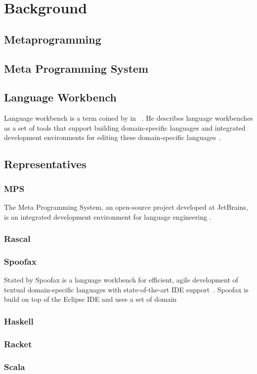 \chapter{Background}

\section{Metaprogramming}

\section{Meta Programming System}

\section{Language Workbench}

Language workbench is a term coined by \citeauthor{fowler2005language} in \citeyear{fowler2005language}~\cite{fowler2005language}.
He describes language workbenches as a set of tools that support building domain-specific languages and integrated development environments for editing these domain-specific languages~\cite{fowler2010domain}.

\section{Representatives}

\subsection{MPS}

The Meta Programming System, an open-source project developed at JetBrains, is an integrated development environment for language engineering \cite{pech2013jetbrains}.

\subsection{Rascal}

\subsection{Spoofax}

Stated by \citeauthor{kats2010spoofax} Spoofax is a language workbench for efficient, agile development of textual domain-specific languages with state-of-the-art IDE support~\cite{kats2010spoofax}.
Spoofax is build on top of the Eclipse IDE and uses a set of domain


\subsection{Haskell}

\subsection{Racket}

\subsection{Scala}
